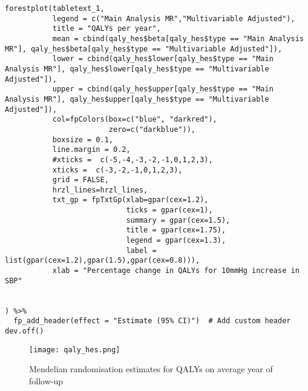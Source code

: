 \documentclass[11pt]{article}
\newcounter{subsubsubsection}[subsubsection]
\begin{document}
\begin{lstlisting}[style=Rstyle]
forestplot(tabletext_1, 
           legend = c("Main Analysis MR","Multivariable Adjusted"),
           title = "QALYs per year",
           mean = cbind(qaly_hes$beta[qaly_hes$type == "Main Analysis MR"], qaly_hes$beta[qaly_hes$type == "Multivariable Adjusted"]),
           lower = cbind(qaly_hes$lower[qaly_hes$type == "Main Analysis MR"], qaly_hes$lower[qaly_hes$type == "Multivariable Adjusted"]),
           upper = cbind(qaly_hes$upper[qaly_hes$type == "Main Analysis MR"], qaly_hes$upper[qaly_hes$type == "Multivariable Adjusted"]),
           col=fpColors(box=c("blue", "darkred"),
                        zero=c("darkblue")),
           boxsize = 0.1,
           line.margin = 0.2,
           #xticks =  c(-5,-4,-3,-2,-1,0,1,2,3),
           xticks =  c(-3,-2,-1,0,1,2,3),
           grid = FALSE,
           hrzl_lines=hrzl_lines,
           txt_gp = fpTxtGp(xlab=gpar(cex=1.2),
                            ticks = gpar(cex=1),
                            summary = gpar(cex=1.5),
                            title = gpar(cex=1.75),
                            legend = gpar(cex=1.3),
                            label = list(gpar(cex=1.2),gpar(1.5),gpar(cex=0.8))),
           xlab = "Percentage change in QALYs for 10mmHg increase in SBP"
           
           
) %>%
  fp_add_header(effect = "Estimate (95% CI)")  # Add custom header
dev.off() 

\end{lstlisting}
\begin{figure}[htbp]
  \centering
  \texttt{[image: qaly\_hes.png]}
  \caption{Mendelian randomisation estimates for QALYs on average year of follow-up}
  \label{fig:3}
\end{figure}
\newpage
{}
\end{document}
